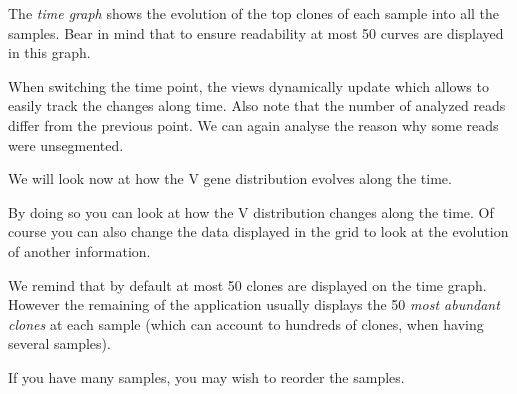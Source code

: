 \documentclass[10pt]{article}
\begin{document}
\label{sec:tracking}

The \textit{time graph} shows the evolution of the top clones of each sample into all the samples.
Bear in mind that to ensure readability at most 50 curves are displayed in this graph.



When switching the time point, the views dynamically update which allows to
easily track the changes along time. Also note that the number of analyzed
reads differ from the previous point. We can again analyse the reason why some
reads were unsegmented.

\bigskip

We will look now at how the V gene distribution evolves along the time.

By doing so you can look at how the V distribution changes along the time.
Of course you can also change the data displayed in the grid to look at
the evolution of another information.

\bigskip

We remind that by default at most 50 clones are displayed
on the time graph. However the remaining of the application usually displays
the 50 \textit{most abundant clones} at each sample (which can account to hundreds of
clones, when having several samples).


\bigskip

If you have many samples, you may wish to reorder the samples.




\bigskip
\end{document}
